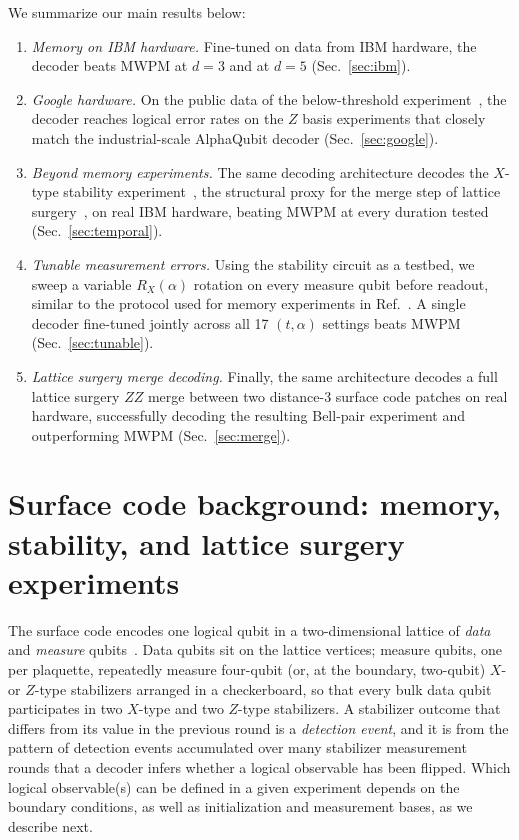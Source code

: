 \documentclass[aps,prxquantum,twocolumn,superscriptaddress,nofootinbib]{revtex4-2}
\begin{document}
We summarize our main results below:
\begin{enumerate}
\item \emph{Memory on IBM hardware.} Fine-tuned on data from IBM hardware, the decoder beats MWPM at $d=3$ and at $d=5$ (Sec.~\ref{sec:ibm}).
\item \emph{Google hardware.} On the public data of the below-threshold experiment~\cite{google2024threshold}, the decoder reaches logical error rates on the $Z$ basis experiments that closely match the industrial-scale AlphaQubit decoder (Sec.~\ref{sec:google}).
\item \emph{Beyond memory experiments.} The same decoding architecture decodes the $X$-type stability experiment~\cite{gidney2022stability}, the structural proxy for the merge step of lattice surgery~\cite{horsman2012lattice}, on real IBM hardware, beating MWPM at every duration tested (Sec.~\ref{sec:temporal}).
\item \emph{Tunable measurement errors.} Using the stability circuit as a testbed, we sweep a variable $R_X(\alpha)$ rotation on every measure qubit before readout, similar to the protocol used for memory experiments in Ref.~\cite{google2024threshold}. A single decoder fine-tuned jointly across all 17 $(t,\alpha)$ settings beats MWPM (Sec.~\ref{sec:tunable}).
\item \emph{Lattice surgery merge decoding.} Finally, the same architecture decodes a full lattice surgery $ZZ$ merge between two distance-3 surface code patches on real hardware, successfully decoding the resulting Bell-pair experiment and outperforming MWPM (Sec.~\ref{sec:merge}).
\end{enumerate}


\section{Surface code background: memory, stability, and lattice surgery experiments}
\label{sec:background}

The surface code encodes one logical qubit in a two-dimensional lattice of \emph{data} and \emph{measure} qubits~\cite{dennis2002topological,fowler2012surface}. Data qubits sit on the lattice vertices; measure qubits, one per plaquette, repeatedly measure four-qubit (or, at the boundary, two-qubit) $X$- or $Z$-type stabilizers arranged in a checkerboard, so that every bulk data qubit participates in two $X$-type and two $Z$-type stabilizers. A stabilizer outcome that differs from its value in the previous round is a \emph{detection event}, and it is from the pattern of detection events accumulated over many stabilizer measurement rounds that a decoder infers whether a logical observable has been flipped. Which logical observable(s) can be defined in a given experiment depends on the boundary conditions, as well as initialization and measurement bases, as we describe next.
\end{document}
